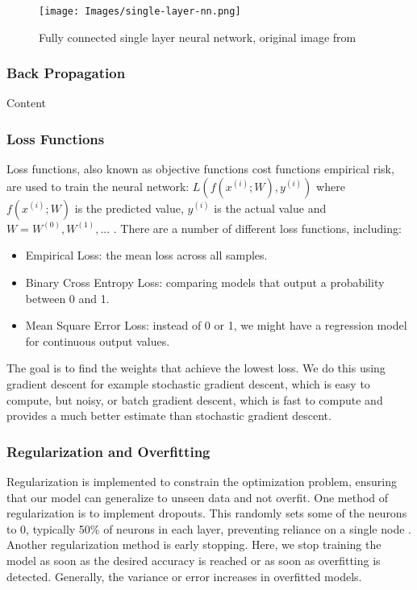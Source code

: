 \documentclass[12pt, a4paper]{article}
\begin{document}
\begin{figure}[H]
\begin{center}
    \texttt{[image: Images/single-layer-nn.png]}
    \caption{Fully connected single layer neural network, original image from \cite{methods-for-ds-slides}}
    \label{fig:nn-architecture}
\end{center}
\end{figure}

\subsubsection{Back Propagation}

Content

\subsubsection{Loss Functions}

Loss functions, also known as objective functions cost functions empirical risk, are used to train the neural network: $L(f(x^{(i)};W), y^{(i)})$ where $f(x^{(i)};W)$ is the predicted value, $y^{(i)}$ is the actual value and $W = {W^{(0)}, W^{(1)}, ...}$ \cite{methods-for-ds-slides}. There are a number of different loss functions, including:

\begin{itemize}
    \item Empirical Loss: the mean loss across all samples.
    \item Binary Cross Entropy Loss: comparing models that output a probability between 0 and 1.
    \item Mean Square Error Loss: instead of 0 or 1, we might have a regression model for continuous output values.
\end{itemize}

The goal is to find the weights that achieve the lowest loss. We do this using gradient descent for example stochastic gradient descent, which is easy to compute, but noisy, or batch gradient descent, which is fast to compute and provides a much better estimate than stochastic gradient descent. 

\subsubsection{Regularization and Overfitting}

Regularization is implemented to constrain the optimization problem, ensuring that our model can generalize to unseen data and not overfit. One method of regularization is to implement dropouts. This randomly sets some of the neurons to 0, typically 50\% of neurons in each layer, preventing reliance on a single node \cite{methods-for-ds-slides}. Another regularization method is early stopping. Here, we stop training the model as soon as the desired accuracy is reached or as soon as overfitting is detected. Generally, the variance or error increases in overfitted models. 
\end{document}

